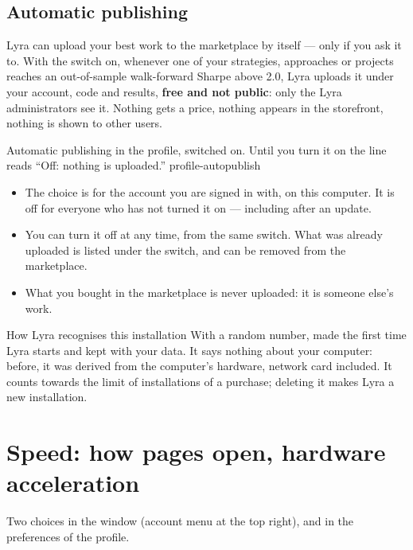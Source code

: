 \subsection{Automatic publishing}\label{sez:auto-publish}

Lyra can upload your best work to the marketplace by itself --- only if you
ask it to. With the switch on, whenever one of your strategies, approaches
or projects reaches an out-of-sample walk-forward Sharpe above 2.0, Lyra
uploads it under your account, code and results, \textbf{free and not
public}: only the Lyra administrators see it. Nothing gets a price, nothing
appears in the storefront, nothing is shown to other users.

  {Automatic publishing in the profile, switched on. Until you turn it on
   the line reads \enquote{Off: nothing is uploaded.}}
  {profile-autopublish}

\begin{itemize}
  \item The choice is for the account you are signed in with, on this
    computer. It is off for everyone who has not turned it on --- including
    after an update.
  \item You can turn it off at any time, from the same switch. What was
    already uploaded is listed under the switch, and can be removed from the
    marketplace.
  \item What you bought in the marketplace is never uploaded: it is someone
    else's work.
\end{itemize}

\begin{nota}{How Lyra recognises this installation}
With a random number, made the first time Lyra starts and kept with your
data. It says nothing about your computer: before, it was derived from the
computer's hardware, network card included. It counts towards the limit of
installations of a purchase; deleting it makes Lyra a new installation.
\end{nota}

\section{Speed: how pages open, hardware acceleration}\label{sez:speed}

Two choices in the  window (account menu at the top right),
and in the preferences of the profile.

